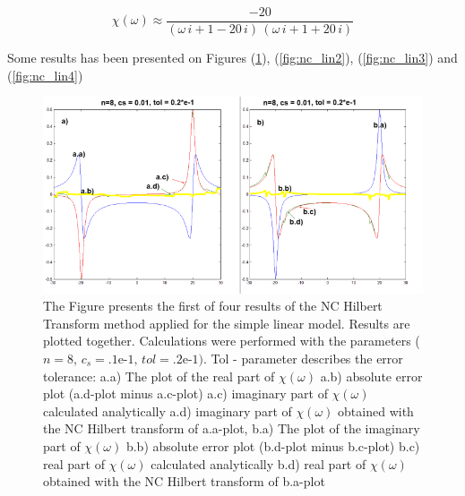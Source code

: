\documentclass[12pt,twoside,a4paper]{article}
\numberwithin{equation}{subsection}
\numberwithin{figure}{subsection}
\begin{document}
\begin{equation} \label{eq:nc_algoritm}
  \chi (\omega ) \approx \frac { - 20}{(\omega \,i + 1 - 20\,i)\,(\omega \,i + 1 + 20\,i)}
\end{equation} 

Some results has been presented on Figures (\ref{fig:nc_lin1}), (\ref{fig:nc_lin2}), (\ref{fig:nc_lin3}) and (\ref{fig:nc_lin4})

\begin{figure}
  \includegraphics[width=150mm]{img/nc_lin1.png}
   \caption{ The Figure presents the first of four results of the NC Hilbert Transform method applied for the simple linear model. Results are plotted together. Calculations were performed with the parameters ($n = 8, \, c_s = \mbox{.1e-1}, \, tol = \mbox{.2e-1})$. Tol - parameter describes the error tolerance:
     a.a) The plot of the real part of $\chi (\omega )$ 
     a.b) absolute error plot (a.d-plot minus a.c-plot) 
     a.c) imaginary part of $\chi (\omega )$ calculated analytically 
     a.d) imaginary part of $\chi (\omega )$ obtained with the NC Hilbert transform of a.a-plot, 
     b.a) The plot of the imaginary part of $\chi (\omega )$ 
     b.b) absolute error plot (b.d-plot minus b.c-plot) 
     b.c) real part of $\chi (\omega )$ calculated analytically 
     b.d) real part of $\chi (\omega )$ obtained with the NC Hilbert transform of b.a-plot 
     \label{fig:nc_lin1}
  }
\end{figure}
\end{document}
